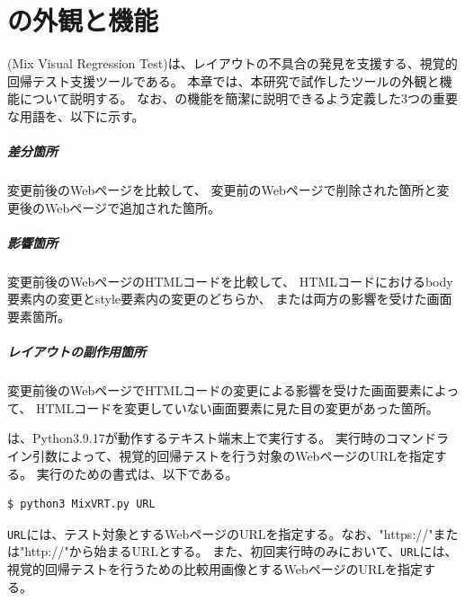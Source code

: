 \chapter{ \toolName の外観と機能}\label{cha:Function}
\toolName (Mix Visual Regression Test)は、レイアウトの不具合の発見を支援する、視覚的回帰テスト支援ツールである。
本章では、本研究で試作したツール\toolName の外観と機能について説明する。
なお、\toolName の機能を簡潔に説明できるよう定義した3つの重要な用語を、以下に示す。
\paragraph{差分箇所}
変更前後のWebページを比較して、
変更前のWebページで削除された箇所と変更後のWebページで追加された箇所。
\paragraph{影響箇所}
変更前後のWebページのHTMLコードを比較して、
HTMLコードにおけるbody要素内の変更とstyle要素内の変更のどちらか、
または両方の影響を受けた画面要素箇所。
\paragraph{レイアウトの副作用箇所}
変更前後のWebページでHTMLコードの変更による影響を受けた画面要素によって、
HTMLコードを変更していない画面要素に見た目の変更があった箇所。
\vspace{8mm}
\par

\toolName は、Python3.9.17\cite{Python}が動作するテキスト端末上で実行する。
\toolName 実行時のコマンドライン引数によって、視覚的回帰テストを行う対象のWebページのURLを指定する。
\toolName 実行のための書式は、以下である。
\begin{lstlisting}[label=list:command,frame=none,numbers=none,basicstyle={\normalsize \ttfamily \color[gray]{.15}}]
  $ python3 MixVRT.py URL
 \end{lstlisting}
{\tt URL}には、テスト対象とするWebページのURLを指定する。なお、"https://"または"http://"から始まるURLとする。
また、初回実行時のみにおいて、{\tt URL}には、視覚的回帰テストを行うための比較用画像とするWebページのURLを指定する。
\par


